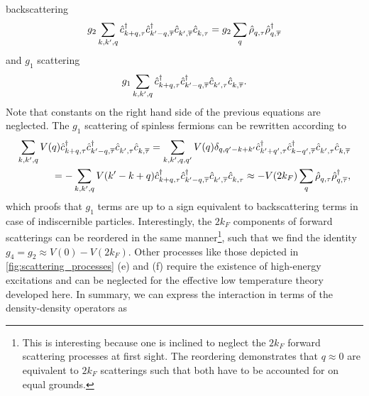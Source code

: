 backscattering
\begin{align}
    g_2\sum_{k,k',q}\hat c^\dag_{k+q,\tau}\hat c^\dag_{k'-q,\overline\tau}\hat c^\pdag_{k',\overline\tau}\hat c^\pdag_{k,\tau} = g_2\sum_q \hat\rho^\pdag_{q,\tau}\hat\rho^\dag_{q,\overline\tau}
\end{align}
and $g_1$ scattering
\begin{align}
    g_1\sum_{k,k',q} \hat c^\dag_{k+q,\tau}\hat c^\dag_{k'-q,\overline\tau}\hat c^\pdag_{k',\tau}\hat c^\pdag_{k,\overline\tau}.
\end{align}
Note that constants on the right hand side of the previous equations are neglected.
The $g_1$ scattering of spinless fermions can be rewritten according to
\begin{align}
    \sum_{k,k',q}V(q)
    \hat c^\dag_{k+q,\tau}\hat c^\dag_{k'-q,\overline\tau}\hat c^\pdag_{k',\tau}\hat c^\pdag_{k,\overline\tau}
    =
    \sum_{k,k',q,q'}V(q) \delta_{q,q'-k+k'}
    \hat c^\dag_{k'+q',\tau}\hat c^\dag_{k-q',\overline\tau}\hat c^\pdag_{k',\tau}\hat c^\pdag_{k,\overline\tau}
    \\
    =
    -\sum_{k,k',q}V(k'-k+q)\hat c^\dag_{k+q,\tau}\hat c^\dag_{k'-q,\overline\tau}\hat c^\pdag_{k',\overline\tau}\hat c^\pdag_{k,\tau}
    \approx -V(2k_F)\sum_q\hat\rho^\pdag_{q,\tau}\hat\rho^\dag_{q,\overline\tau},
    \label{eq:umklapp_backscattering_equivalence}
\end{align}
which proofs that $g_1$ terms are up to a sign equivalent to backscattering terms in case of indiscernible particles.
Interestingly, the $2k_F$ components of forward scatterings can be reordered in the same manner\footnote{This is interesting because one is inclined to neglect the $2k_F$ forward scattering processes at first sight. The reordering demonstrates that $q\approx0$ are equivalent to $2k_F$ scatterings such that both have to be accounted for on equal grounds.}, such that we find the identity $g_4 = g_2 \approx V(0)-V(2k_F)$.
Other processes like those depicted in \cref{fig:scattering_processes} (e) and (f) require the existence of high-energy excitations and can be neglected for the effective low temperature theory developed here.
In summary, we can express the interaction in terms of the density-density operators as
